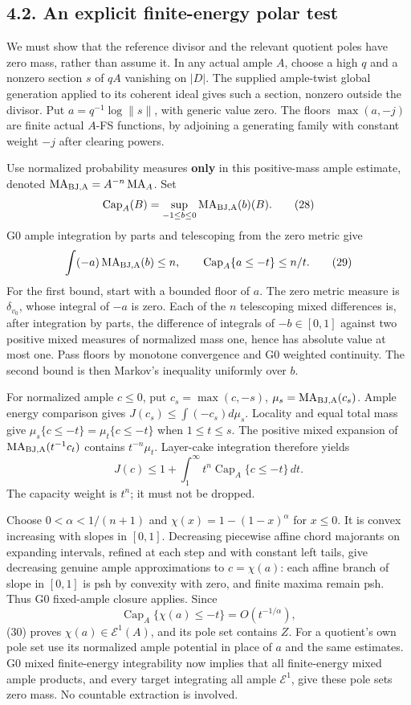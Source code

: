 \documentclass[
  10pt,
]{article}
\begin{document}
\subsection{4.2. An explicit finite-energy polar
test}\label{an-explicit-finite-energy-polar-test}

We must show that the reference divisor and the relevant quotient poles
have zero mass, rather than assume it. In any actual ample \(A\), choose
a high \(q\) and a nonzero section \(s\) of \(qA\) vanishing on \(|D|\).
The supplied ample-twist global generation applied to its coherent ideal
gives such a section, nonzero outside the divisor. Put
\(a=q^{-1}\log\|s\|\), with generic value zero. The floors
\(\max(a,-j)\) are finite actual \(A\)-FS functions, by adjoining a
generating family with constant weight \(-j\) after clearing powers.

Use normalized probability measures \textbf{only} in this positive-mass
ample estimate, denoted
\(\operatorname{MA}_{\rm BJ,A}=A^{-n}\operatorname{MA}_A\). Set
\[\operatorname{Cap}_A(B)=\sup_{-1\leq b\leq0}\operatorname{MA}_{\rm BJ,A}(b)(B).\tag{28}\]
G0 ample integration by parts and telescoping from the zero metric give
\[\int(-a)\operatorname{MA}_{\rm BJ,A}(b)\leq n,
\qquad \operatorname{Cap}_A\{a\leq-t\}\leq n/t.\tag{29}\] For the first
bound, start with a bounded floor of \(a\). The zero metric measure is
\(\delta_{v_0}\), whose integral of \(-a\) is zero. Each of the \(n\)
telescoping mixed differences is, after integration by parts, the
difference of integrals of \(-b\in[0,1]\) against two positive mixed
measures of normalized mass one, hence has absolute value at most one.
Pass floors by monotone convergence and G0 weighted continuity. The
second bound is then Markov's inequality uniformly over \(b\).

For normalized ample \(c\leq0\), put \(c_s=\max(c,-s)\),
\(\mu_s=\operatorname{MA}_{\rm BJ,A}(c_s)\). Ample energy comparison
gives \(J(c_s)\leq\int(-c_s)d\mu_s\). Locality and equal total mass give
\(\mu_s\{c\leq-t\}=\mu_t\{c\leq-t\}\) when \(1\leq t\leq s\). The
positive mixed expansion of \(\operatorname{MA}_{\rm BJ,A}(t^{-1}c_t)\)
contains \(t^{-n}\mu_t\). Layer-cake integration therefore yields
\[J(c)\leq1+\int_1^\infty t^n\operatorname{Cap}_A\{c\leq-t\}\,dt.\tag{30}\]
The capacity weight is \(t^n\); it must not be dropped.

Choose \(0<\alpha<1/(n+1)\) and \(\chi(x)=1-(1-x)^\alpha\) for
\(x\leq0\). It is convex increasing with slopes in \([0,1]\). Decreasing
piecewise affine chord majorants on expanding intervals, refined at each
step and with constant left tails, give decreasing genuine ample
approximations to \(c=\chi(a)\): each affine branch of slope in
\([0,1]\) is psh by convexity with zero, and finite maxima remain psh.
Thus G0 fixed-ample closure applies. Since
\[\operatorname{Cap}_A\{\chi(a)\leq-t\}=O(t^{-1/\alpha}),\tag{31}\] (30)
proves \(\chi(a)\in\mathcal E^1(A)\), and its pole set contains \(Z\).
For a quotient's own pole set use its normalized ample potential in
place of \(a\) and the same estimates. G0 mixed finite-energy
integrability now implies that all finite-energy mixed ample products,
and every target integrating all ample \(\mathcal E^1\), give these pole
sets zero mass. No countable extraction is involved.
\end{document}
